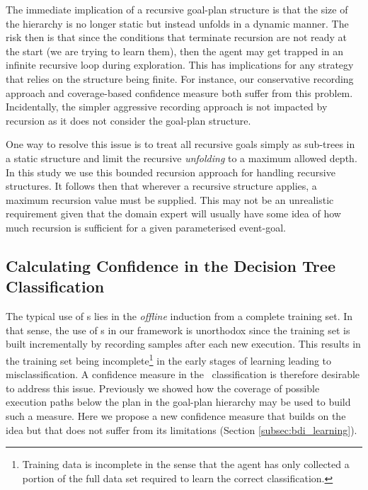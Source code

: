 The immediate implication of a recursive goal-plan structure is that the size of the hierarchy is no longer static but instead unfolds in a dynamic manner. The risk then is that since the conditions that terminate recursion are not ready at the start (we are trying to learn them), then the agent may get trapped in an infinite recursive loop during exploration. This has implications for any strategy that relies on the structure being finite. For instance, our conservative recording approach \cite{Airiau:IJAT:09} and coverage-based confidence measure \cite{Singh:AAMAS10} both suffer from this problem. Incidentally, the simpler aggressive recording approach \cite{Airiau:IJAT:09} is not impacted by recursion as it does not consider the goal-plan structure.

One way to resolve this issue is to treat all recursive goals simply as sub-trees in a static structure and limit the recursive \textit{unfolding}  to a maximum allowed depth. In this study we use this bounded recursion approach for handling recursive structures. It follows then that wherever a recursive structure applies, a maximum recursion value must be supplied. This may not be an unrealistic requirement given that the domain expert will usually have some idea of how much recursion is sufficient for a given parameterised event-goal. 

\subsection{Calculating Confidence in the Decision Tree Classification}

The typical use of \dt s lies in the \textit{offline} induction from a complete training set. In that sense, the use of \dt s in our framework is unorthodox since the training set is built incrementally by recording samples after each new execution. This results in the training set being incomplete\footnote{Training data is incomplete in the sense that the agent has only collected a portion of the full data set required to learn the correct classification.} in the early stages of learning leading to misclassification. A confidence measure in the \dt\ classification is therefore desirable to address this issue. Previously \cite{Singh:AAMAS10} we showed how the coverage of possible execution paths below the plan in the goal-plan hierarchy may be used to build such a measure. Here we propose a new confidence measure that builds on the idea but that does not suffer from its limitations (Section \ref{subsec:bdi_learning}).

